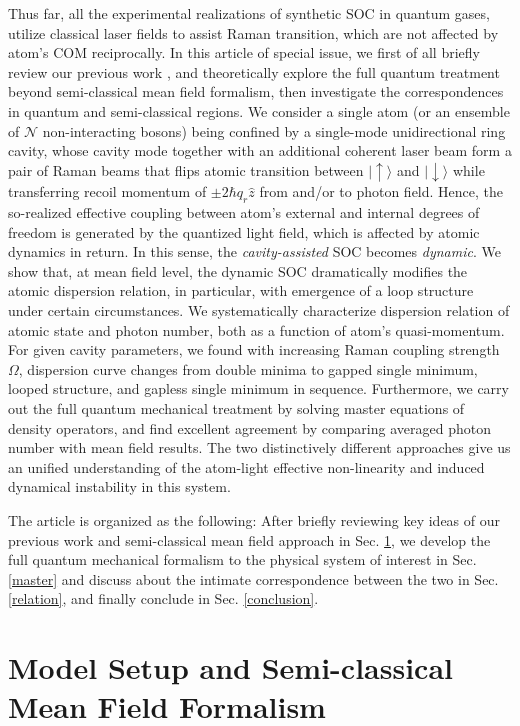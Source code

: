 \documentclass[journal,article,accept,moreauthors,pdftex,12pt,a4paper]{mdpi}
\begin{document}
Thus far, all the experimental realizations of synthetic SOC in quantum gases, utilize classical laser fields to assist Raman transition, which are not affected by atom's COM reciprocally. In this article of special issue, we first of all briefly review our previous work \cite{cavitySOC}, and theoretically explore the full quantum treatment beyond semi-classical mean field formalism, then investigate the correspondences in quantum and semi-classical regions. We consider a single atom (or an ensemble of $\mathcal{N}$ non-interacting  bosons) being confined by a single-mode unidirectional ring cavity, whose cavity mode together with an additional coherent laser beam form a pair of Raman beams that flips atomic transition between $|\uparrow\rangle$ and $|\downarrow\rangle$ while transferring recoil momentum of $\pm2\hbar q_r\hat{z}$ from and/or to photon field. Hence, the so-realized effective coupling between atom's external and internal degrees of freedom is generated by the quantized light field, which is affected by atomic dynamics in return. In this sense, the {\em cavity-assisted} SOC becomes {\em dynamic}. We show that, at mean field level, the dynamic SOC dramatically modifies the atomic dispersion relation, in particular, with emergence of a loop structure under certain circumstances. We systematically characterize dispersion relation of atomic state and photon number, both as a function of atom's quasi-momentum. For given cavity parameters, we found with increasing Raman coupling strength $\Omega$, dispersion curve changes from double minima to gapped single minimum, looped structure, and gapless single minimum in sequence. Furthermore, we carry out the full quantum mechanical treatment by solving master equations of density operators, and find excellent agreement by comparing averaged photon number with mean field results. The two distinctively different approaches give us an unified understanding of the atom-light effective non-linearity and induced dynamical instability in this system.

The article is organized as the following: After briefly reviewing key ideas of our previous work and semi-classical mean field approach in Sec. \ref{meanfield}, we develop the full quantum mechanical formalism to the physical system of interest in Sec. \ref{master} and discuss about the intimate correspondence between the two in Sec. \ref{relation}, and finally conclude in Sec. \ref{conclusion}. 

\section{Model Setup and Semi-classical Mean Field Formalism} \label{meanfield}
\end{document}
